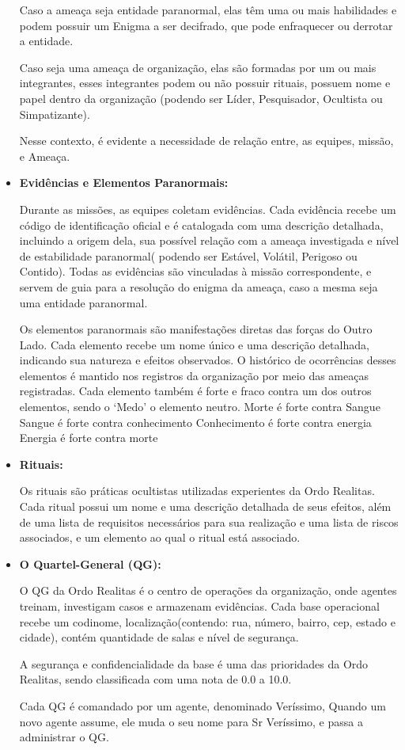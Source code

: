 \documentclass[12pt,a4paper]{report}
\begin{document}
\begin{itemize}
    Caso a ameaça seja entidade paranormal, elas têm uma ou mais habilidades e podem possuir um Enigma a ser decifrado, que pode enfraquecer ou derrotar a entidade. 
    
    Caso seja uma ameaça de organização, elas são formadas por um ou mais integrantes, esses integrantes podem ou não possuir rituais, possuem nome e papel dentro da organização (podendo ser Líder, Pesquisador, Ocultista ou Simpatizante).
    
    Nesse contexto, é evidente a necessidade de relação entre, as equipes, missão, e Ameaça.

    
    \item \textbf {Evidências e Elementos Paranormais:}
    
    Durante as missões, as equipes coletam evidências. Cada evidência recebe um código de identificação oficial e é catalogada com uma descrição detalhada, incluindo a origem dela, sua possível relação com a ameaça investigada e nível de estabilidade paranormal( podendo ser Estável, Volátil, Perigoso ou Contido). Todas as evidências são vinculadas à missão correspondente, e servem de guia para a resolução do enigma da ameaça, caso a mesma seja uma entidade paranormal.
    
    Os elementos paranormais são manifestações diretas das forças do Outro Lado. Cada elemento recebe um nome único e uma descrição detalhada, indicando sua natureza e efeitos observados. O histórico de ocorrências desses elementos é mantido nos registros da organização por meio das ameaças registradas. Cada elemento também é forte e fraco contra um dos outros elementos, sendo o ‘Medo’ o elemento neutro.
	Morte é forte contra Sangue
	Sangue é forte contra conhecimento
	Conhecimento é forte contra energia 
	Energia é forte contra morte

    
    \item \textbf {Rituais:}
    
    Os rituais são práticas ocultistas utilizadas experientes da Ordo Realitas. Cada ritual possui um nome e uma descrição detalhada de seus efeitos, além de uma lista de requisitos necessários para sua realização e uma lista de riscos associados, e um elemento ao qual o ritual está associado.

    
    \item \textbf {O Quartel-General (QG):}
    
    O QG da Ordo Realitas é o centro de operações da organização, onde agentes treinam, investigam casos e armazenam evidências. Cada base operacional recebe um codinome, localização(contendo: rua, número, bairro, cep, estado e cidade), contém quantidade de salas e nível de segurança.
    
    A segurança e confidencialidade da base é uma das prioridades da Ordo Realitas, sendo classificada com uma nota de 0.0 a 10.0.
    
    Cada QG é comandado por um agente, denominado Veríssimo, Quando um novo agente assume, ele muda o seu nome para Sr Veríssimo, e passa a administrar o QG.


\end{itemize}
\end{document}
